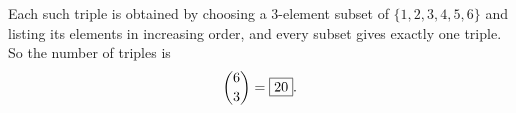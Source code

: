 Each such triple is obtained by choosing a $3$-element subset of $\{1,2,3,4,5,6\}$ and listing its elements in increasing order, and every subset gives exactly one triple. So the number of triples is
\[\dbinom63=\boxed{20}.\]
